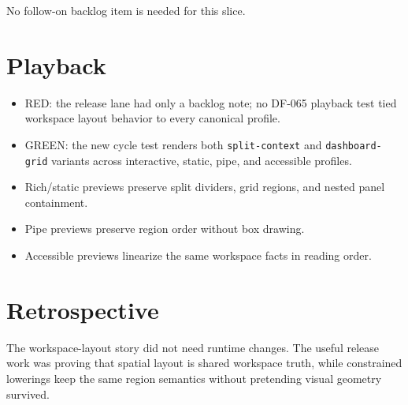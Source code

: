 No follow-on backlog item is needed for this slice.

\section{Playback}\label{record-106-playback}

\begin{itemize}
\tightlist
\item
  RED: the release lane had only a backlog note; no DF-065 playback test tied workspace layout behavior to every canonical profile.
\item
  GREEN: the new cycle test renders both \texttt{s\allowbreak{}p\allowbreak{}l\allowbreak{}i\allowbreak{}t\allowbreak{}-\allowbreak{}c\allowbreak{}o\allowbreak{}n\allowbreak{}t\allowbreak{}e\allowbreak{}x\allowbreak{}t} and \texttt{d\allowbreak{}a\allowbreak{}s\allowbreak{}h\allowbreak{}b\allowbreak{}o\allowbreak{}a\allowbreak{}r\allowbreak{}d\allowbreak{}-\allowbreak{}g\allowbreak{}r\allowbreak{}i\allowbreak{}d} variants across interactive, static, pipe, and accessible profiles.
\item
  Rich/static previews preserve split dividers, grid regions, and nested panel containment.
\item
  Pipe previews preserve region order without box drawing.
\item
  Accessible previews linearize the same workspace facts in reading order.
\end{itemize}

\section{Retrospective}\label{record-106-retrospective}

The workspace-layout story did not need runtime changes. The useful release work was proving that spatial layout is shared workspace truth, while constrained lowerings keep the same region semantics without pretending visual geometry survived.

